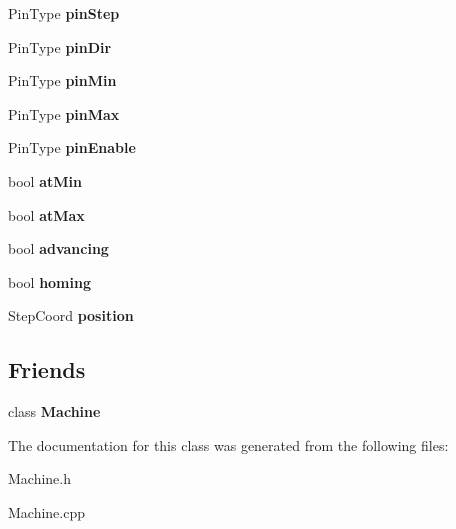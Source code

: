 \begin{DoxyCompactItemize}
\item 
\hypertarget{classfirestep_1_1_axis_ae85f9c25e4103a7d6300eb4e57762252}{Pin\+Type {\bfseries pin\+Step}}\label{classfirestep_1_1_axis_ae85f9c25e4103a7d6300eb4e57762252}

\item 
\hypertarget{classfirestep_1_1_axis_a0e82de8343385dcebe568d939cd5b871}{Pin\+Type {\bfseries pin\+Dir}}\label{classfirestep_1_1_axis_a0e82de8343385dcebe568d939cd5b871}

\item 
\hypertarget{classfirestep_1_1_axis_a35470302f44ea271f874d321db1a3e0b}{Pin\+Type {\bfseries pin\+Min}}\label{classfirestep_1_1_axis_a35470302f44ea271f874d321db1a3e0b}

\item 
\hypertarget{classfirestep_1_1_axis_a76a3e037d5dc3dfbd3064025d2083ce9}{Pin\+Type {\bfseries pin\+Max}}\label{classfirestep_1_1_axis_a76a3e037d5dc3dfbd3064025d2083ce9}

\item 
\hypertarget{classfirestep_1_1_axis_a599af59c29e448c5115af0f38763c997}{Pin\+Type {\bfseries pin\+Enable}}\label{classfirestep_1_1_axis_a599af59c29e448c5115af0f38763c997}

\item 
\hypertarget{classfirestep_1_1_axis_a9b92857d5a540acc307626abc2deff95}{bool {\bfseries at\+Min}}\label{classfirestep_1_1_axis_a9b92857d5a540acc307626abc2deff95}

\item 
\hypertarget{classfirestep_1_1_axis_aa13843eed3f8f256193ddb7b7b760689}{bool {\bfseries at\+Max}}\label{classfirestep_1_1_axis_aa13843eed3f8f256193ddb7b7b760689}

\item 
\hypertarget{classfirestep_1_1_axis_ad56a01002de04cfd029828ba0fd67fd2}{bool {\bfseries advancing}}\label{classfirestep_1_1_axis_ad56a01002de04cfd029828ba0fd67fd2}

\item 
\hypertarget{classfirestep_1_1_axis_a57f2295a0aa5843e51225572d85e1a93}{bool {\bfseries homing}}\label{classfirestep_1_1_axis_a57f2295a0aa5843e51225572d85e1a93}

\item 
\hypertarget{classfirestep_1_1_axis_ae198283ad35b286566045d2cd7b19ee3}{Step\+Coord {\bfseries position}}\label{classfirestep_1_1_axis_ae198283ad35b286566045d2cd7b19ee3}

\end{DoxyCompactItemize}
\subsection*{Friends}
\begin{DoxyCompactItemize}
\item 
\hypertarget{classfirestep_1_1_axis_a35e3286152af9300727337705348e57f}{class {\bfseries Machine}}\label{classfirestep_1_1_axis_a35e3286152af9300727337705348e57f}

\end{DoxyCompactItemize}


The documentation for this class was generated from the following files\+:\begin{DoxyCompactItemize}
\item 
Machine.\+h\item 
Machine.\+cpp\end{DoxyCompactItemize}

